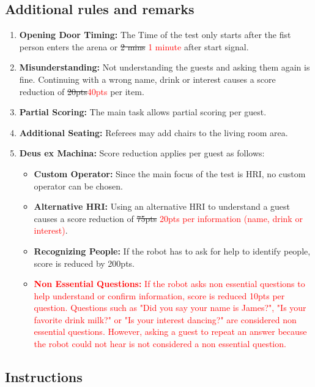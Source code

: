 \subsection*{Additional rules and remarks}
\begin{enumerate}[nosep]
	\item \textbf{Opening Door Timing:} The Time of the test only starts after the fist person enters the arena or \sout{2 mins} \textcolor{red}{1 minute} after start signal.

	\item \textbf{Misunderstanding:} Not understanding the guests and asking them again is fine. Continuing with a wrong name, drink or interest causes a score reduction of \sout{20pts}\textcolor{red}{40pts} per item.
		
	\item \textbf{Partial Scoring:} The main task allows partial scoring per guest.

	\item \textbf{Additional Seating:} Referees may add chairs to the living room area.
	
	\item \textbf{Deus ex Machina:} Score reduction applies per guest as follows:
	\begin{itemize}[nosep]
		\item \textbf{Custom Operator:} Since the main focus of the test is HRI, no custom operator can be chosen.
		\item \textbf{Alternative HRI:} Using an alternative HRI to understand a guest causes a score reduction of \sout{75pts} \textcolor{red}{20pts per information (name, drink or interest)}.
		\item \textbf{Recognizing People:} If the robot has to ask for help to identify people, score is reduced by 200pts. 
		\item \textcolor{red}{\textbf{Non Essential Questions:} If the robot asks non essential questions to help understand or confirm information, score is reduced 10pts per question. 
		Questions such as "Did you say your name is James?", "Is your favorite drink milk?" or "Is your interest dancing?" are considered non essential questions. 
		However, asking a guest to repeat an answer because the robot could not hear is not considered a non essential question.}
	\end{itemize}
\end{enumerate}


\subsection*{Instructions}

